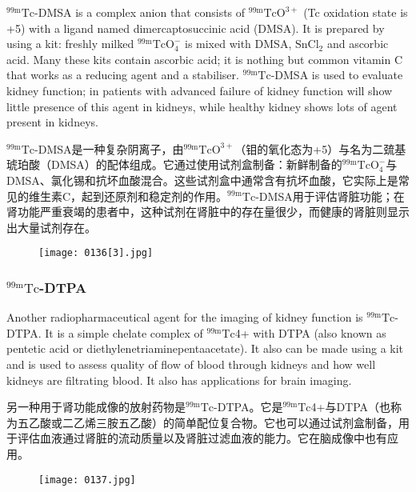 \documentclass[dvipsnames, svgnames,a4paper,11pt]{article}
\begin{document}
${}^\mathrm{99m}\mathrm{Tc}$-DMSA is a complex anion that consists of ${}^\mathrm{99m}\mathrm{TcO^{3+}}$ (Tc oxidation state is +5)
with a ligand named dimercaptosuccinic acid (DMSA). It is prepared by using a kit:
freshly milked ${}^\mathrm{99m}\mathrm{TcO_4^-}$ is mixed with DMSA, $\mathrm{SnCl_2}$ and ascorbic acid. Many these
kits contain ascorbic acid; it is nothing but common vitamin C that works as a
reducing agent and a stabiliser. ${}^\mathrm{99m}\mathrm{Tc}$-DMSA is used to evaluate kidney function; in
patients with advanced failure of kidney function will show little presence of this
agent in kidneys, while healthy kidney shows lots of agent present in kidneys.

${}^\mathrm{99m}\mathrm{Tc}$-DMSA是一种复杂阴离子，由${}^\mathrm{99m}\mathrm{TcO^{3+}}$（钼的氧化态为+5）与名为二巯基琥珀酸（DMSA）的配体组成。它通过使用试剂盒制备：新鲜制备的${}^\mathrm{99m}\mathrm{TcO_4^-}$与DMSA、氯化锡和抗坏血酸混合。这些试剂盒中通常含有抗坏血酸，它实际上是常见的维生素C，起到还原剂和稳定剂的作用。${}^\mathrm{99m}\mathrm{Tc}$-DMSA用于评估肾脏功能；在肾功能严重衰竭的患者中，这种试剂在肾脏中的存在量很少，而健康的肾脏则显示出大量试剂存在。

\begin{figure}[h]
	\centering
    \texttt{[image: 0136[3].jpg]}    
     \label{fig140}
\end{figure}

\subsubsection{${}^\mathrm{99m}\mathrm{Tc}$-DTPA}

Another radiopharmaceutical agent for the imaging of kidney function is ${}^\mathrm{99m}\mathrm{Tc}$-DTPA.
It is a simple chelate complex of ${}^\mathrm{99m}\mathrm{Tc}$4+ with DTPA (also known as pentetic acid or
diethylenetriaminepentaacetate). It also can be made using a kit and is used to
assess quality of flow of blood through kidneys and how well kidneys are filtrating
blood. It also has applications for brain imaging.

另一种用于肾功能成像的放射药物是${}^\mathrm{99m}\mathrm{Tc}$-DTPA。它是${}^\mathrm{99m}\mathrm{Tc}$4+与DTPA（也称为五乙酸或二乙烯三胺五乙酸）的简单配位复合物。它也可以通过试剂盒制备，用于评估血液通过肾脏的流动质量以及肾脏过滤血液的能力。它在脑成像中也有应用。

\begin{figure}[h]
	\centering
    \texttt{[image: 0137.jpg]}    
     \label{fig141}
\end{figure}
\end{document}
